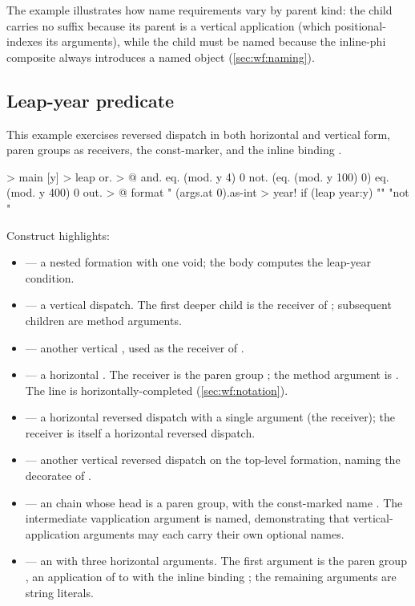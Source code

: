The example illustrates how name requirements vary by parent kind:
  the child  carries no suffix because its parent is a vertical
  application (which positional-indexes its arguments), while the child
   must be named because the inline-phi composite
  always introduces a named object (\cref{sec:wf:naming}).

\subsection{Leap-year predicate}\label{app:ex:leap}

This example exercises reversed dispatch in both horizontal and vertical
  form, paren groups as receivers, the const-marker, and the inline
  binding .

\begin{ffcode}
[args] > main
  [y] > leap
    or. > @
      and.
        eq. (mod. y 4) 0
        not. (eq. (mod. y 100) 0)
      eq. (mod. y 400) 0
  out. > @
    format
      "%
      (args.at 0).as-int > year!
      if (leap year:y) "" "not "
\end{ffcode}

Construct highlights:

\begin{itemize}
  \item {} --- a nested formation with one void; the body
    computes the leap-year condition.
  \item {} --- a vertical  dispatch.
    The first deeper child is the receiver of ; subsequent
    children are method arguments.
  \item {} --- another vertical , used as the
    receiver of .
  \item {} --- a horizontal .
    The receiver is the paren group ; the method argument
    is . The line is horizontally-completed
    (\cref{sec:wf:notation}).
  \item {} --- a horizontal reversed dispatch
    with a single argument (the receiver); the receiver is itself a
    horizontal reversed dispatch.
  \item {} --- another vertical reversed dispatch on the
    top-level formation, naming the decoratee of .
  \item {} --- an  chain whose
    head is a paren group, with the const-marked name .
    The intermediate vapplication argument is named, demonstrating that
    vertical-application arguments may each carry their own optional names.
  \item {} --- an  with
    three horizontal arguments. The first argument is the paren group
    , an application of  to  with
    the inline binding ; the remaining arguments are string
    literals.
\end{itemize}


